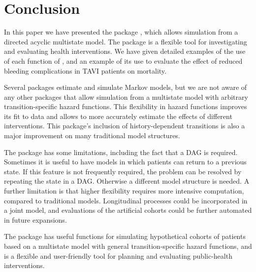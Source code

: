 \section{Conclusion} \label{conc}
In this paper we have presented the  package , which allows simulation from a directed acyclic multistate model. The  package  is a flexible tool for investigating and evaluating health interventions. We have given detailed examples of the use of each function of , and an example of its use to evaluate the effect of reduced bleeding complications in TAVI patients on mortality. 

Several packages estimate and simulate Markov models, but we are not aware of any other packages that allow simulation from a multistate model with arbitrary transition-specific hazard functions. This flexibility in hazard functions improves its fit to data and allows to more accurately estimate the effects of different interventions. This package's inclusion of history-dependent transitions is also a major improvement on many traditional model structures. 

The  package has some limitations, including the fact that a DAG is required. Sometimes it is useful to have models in which patients can return to a previous state. If this feature is not frequently required, the problem can be resolved by repeating the state in a DAG. Otherwise a different model structure is needed. A further limitation is that higher flexibility requires more intensive computation, compared to traditional models. Longitudinal processes could be incorporated in a joint model, and evaluations of the artificial cohorts could be further automated in future expansions. 

The  package has useful functions for simulating hypothetical cohorts of patients based on a multistate model with general transition-specific hazard functions, and is a flexible and user-friendly tool for planning and evaluating public-health interventions.